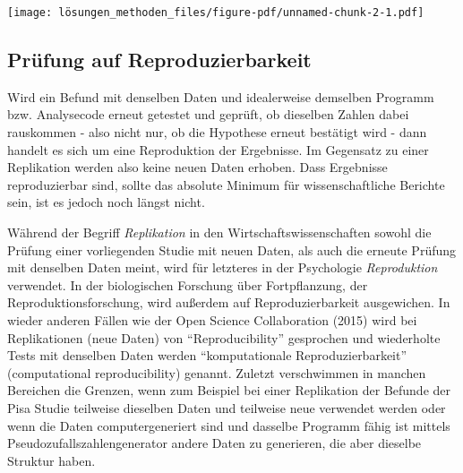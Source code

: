 \documentclass[
  letterpaper,
  DIV=11,
  numbers=noendperiod]{scrreprt}
\begin{document}
\texttt{[image: lösungen\_methoden\_files/figure-pdf/unnamed-chunk-2-1.pdf]}

\subsection{Prüfung auf
Reproduzierbarkeit}\label{pruxfcfung-auf-reproduzierbarkeit}

Wird ein Befund mit denselben Daten und idealerweise demselben Programm
bzw. Analysecode erneut getestet und geprüft, ob dieselben Zahlen dabei
rauskommen - also nicht nur, ob die Hypothese erneut bestätigt wird -
dann handelt es sich um eine Reproduktion der Ergebnisse. Im Gegensatz
zu einer Replikation werden also keine neuen Daten erhoben. Dass
Ergebnisse reproduzierbar sind, sollte das absolute Minimum für
wissenschaftliche Berichte sein, ist es jedoch noch längst nicht.

\begin{tcolorbox}[enhanced jigsaw, left=2mm, colback=white, colframe=quarto-callout-important-color-frame, opacitybacktitle=0.6, opacityback=0, title=\textcolor{quarto-callout-important-color}{\faExclamation}\hspace{0.5em}{Begriffs-Wirrwarr}, toptitle=1mm, coltitle=black, colbacktitle=quarto-callout-important-color!10!white, titlerule=0mm, bottomtitle=1mm, leftrule=.75mm, breakable, rightrule=.15mm, bottomrule=.15mm, toprule=.15mm, arc=.35mm]

Während der Begriff \emph{Replikation} in den Wirtschaftswissenschaften
sowohl die Prüfung einer vorliegenden Studie mit neuen Daten, als auch
die erneute Prüfung mit denselben Daten meint, wird für letzteres in der
Psychologie \emph{Reproduktion} verwendet. In der biologischen Forschung
über Fortpflanzung, der Reproduktionsforschung, wird außerdem auf
Reproduzierbarkeit ausgewichen. In wieder anderen Fällen wie der Open
Science Collaboration (2015) wird bei Replikationen (neue Daten) von
``Reproducibility'' gesprochen und wiederholte Tests mit denselben Daten
werden ``komputationale Reproduzierbarkeit'' (computational
reproducibility) genannt. Zuletzt verschwimmen in manchen Bereichen die
Grenzen, wenn zum Beispiel bei einer Replikation der Befunde der Pisa
Studie teilweise dieselben Daten und teilweise neue verwendet werden
oder wenn die Daten computergeneriert sind und dasselbe Programm fähig
ist mittels Pseudozufallszahlengenerator andere Daten zu generieren, die
aber dieselbe Struktur haben.

\end{tcolorbox}
\end{document}
